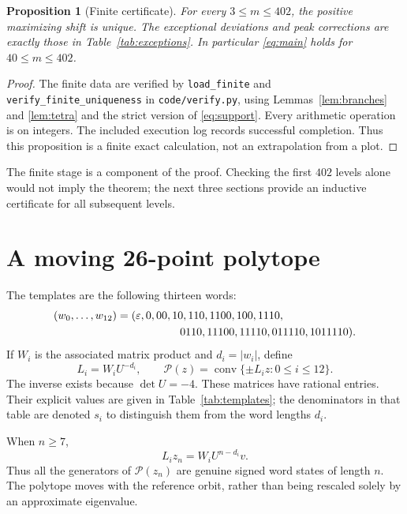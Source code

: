 \documentclass[11pt,a4paper]{article}
\newtheorem{proposition}[theorem]{Proposition}
\theoremstyle{definition}\newtheorem{definition}[theorem]{Definition}
\theoremstyle{remark}\newtheorem{remark}[theorem]{Remark}
\newcommand{\conv}{\operatorname{conv}}
\newcommand{\ee}{\varepsilon}
\newcommand{\cP}{\mathcal P}
\begin{document}
\begin{proposition}[Finite certificate]
\label{prop:finite}
For every $3\le m\le402$, the positive maximizing shift is unique.
The exceptional deviations and peak corrections are exactly those in
Table~\ref{tab:exceptions}. In particular \eqref{eq:main} holds for
$40\le m\le402$.
\end{proposition}
\begin{proof}
The finite data are verified by \texttt{load\_finite} and
\texttt{verify\_finite\_uniqueness} in \texttt{code/verify.py}, using
Lemmas~\ref{lem:branches} and \ref{lem:tetra} and the strict version of
\eqref{eq:support}. Every arithmetic operation is on integers. The included
execution log records successful completion. Thus this proposition is a
finite exact calculation, not an extrapolation from a plot.
\end{proof}

The finite stage is a component of the proof. Checking the first $402$ levels
alone would not imply the theorem; the next three sections provide an
inductive certificate for all subsequent levels.

\section{A moving 26-point polytope}
\label{sec:polytope}

The templates are the following thirteen words:
\begin{equation}
\begin{split}
 (w_0,\ldots,w_{12})={}&(\ee,0,00,10,110,1100,100,1110,\\
                      &\hspace{4.4em}0110,11100,11110,011110,1011110).
\end{split}
\label{eq:words}
\end{equation}
If $W_i$ is the associated matrix product and $d_i=|w_i|$, define
\begin{equation}
 L_i=W_iU^{-d_i},\qquad
 \cP(z)=\conv\{\pm L_i z:0\le i\le12\}.
 \label{eq:P}
\end{equation}
The inverse exists because $\det U=-4$.
These matrices have rational entries. Their explicit values are given in
Table~\ref{tab:templates}; the denominators in that table are denoted $s_i$
to distinguish them from the word lengths $d_i$.

When $n\ge7$,
\[
 L_i z_n=W_iU^{n-d_i}v.
\]
Thus all the generators of $\cP(z_n)$ are genuine signed word states of
length $n$. The polytope moves with the reference orbit, rather than being
rescaled solely by an approximate eigenvalue.
\end{document}

